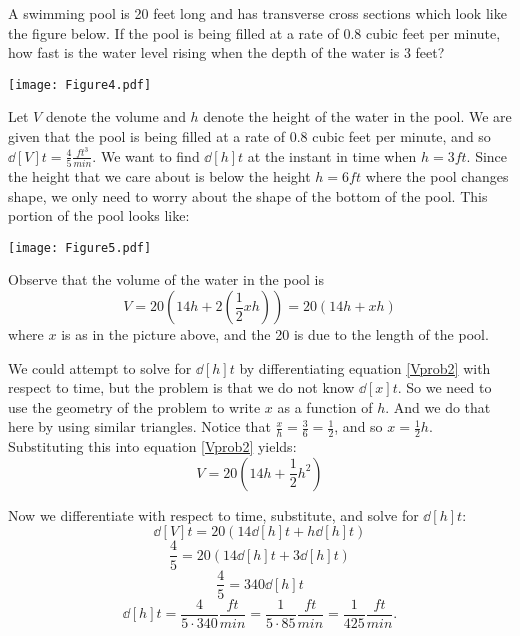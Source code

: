 \documentclass[handout,nooutcomes]{ximera}
\begin{document}
\begin{problem}
A swimming pool is 20 feet long and has transverse cross sections which look like the figure below.   If the pool is being filled at a rate of 0.8 cubic feet per minute, how fast is the water level rising when the depth of the water is 3 feet? 
	\begin{image}
	\texttt{[image: Figure4.pdf]}
	\end{image}
	
		\begin{freeResponse}
		Let $V$ denote the volume and $h$ denote the height of the water in the pool.  We are given that the pool is being filled at a rate of $0.8$ cubic feet per minute, and so $\dd[V]{t} = \frac{4}{5} \frac{ft^3}{min}$.  We want to find $\dd[h]{t}$ at the instant in time when $h=3 ft$.  Since the height that we care about is below the height $h=6 ft$ where the pool changes shape, we only need to worry about the shape of the bottom of the pool.  This portion of the pool looks like:
		
		\begin{image}
		\texttt{[image: Figure5.pdf]}
		\end{image}
		
		Observe that the volume of the water in the pool is
		\begin{equation}\label{Vprob2}
		V = 20 \left( 14h + 2 \left( \frac{1}{2} xh \right) \right) = 20 \left( 14h + xh \right)
		\end{equation}
		where $x$ is as in the picture above, and the 20 is due to the length of the pool.  
		
		We could attempt to solve for $\dd[h]{t}$ by differentiating equation \ref{Vprob2} with respect to time, but the problem is that we do not know $\dd[x]{t}$.  So we need to use the geometry of the problem to write $x$ as a function of $h$.  And we do that here by using similar triangles.  Notice that $\frac{x}{h} = \frac{3}{6} = \frac{1}{2}$, and so $x = \frac{1}{2} h$.  Substituting this into equation \ref{Vprob2} yields:
		$$ V = 20 \left( 14h + \frac{1}{2} h^2 \right) $$
		
		Now we differentiate with respect to time, substitute, and solve for $\dd[h]{t}$:
		$$ \dd[V]{t} = 20 \left( 14 \dd[h]{t} + h \dd[h]{t} \right) $$
		$$ \frac{4}{5} = 20 \left( 14 \dd[h]{t} + 3 \dd[h]{t} \right) $$
		$$ \frac{4}{5} = 340 \dd[h]{t} $$
		$$ \dd[h]{t} = \frac{4}{5 \cdot 340} \frac{ft}{min} = \frac{1}{5 \cdot 85} \frac{ft}{min} = \frac{1}{425} \frac{ft}{min}. $$
		
		\end{freeResponse}
		
		
		

\end{problem}
	
\end{document}
